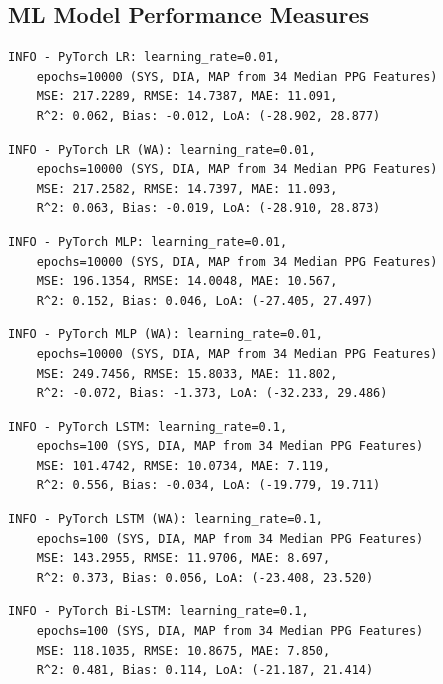 \subsection{ML Model Performance Measures}\label{subsec:misc_measures}

\onehalfspacing

\begin{verbatim}
INFO - PyTorch LR: learning_rate=0.01,
    epochs=10000 (SYS, DIA, MAP from 34 Median PPG Features)
    MSE: 217.2289, RMSE: 14.7387, MAE: 11.091,
    R^2: 0.062, Bias: -0.012, LoA: (-28.902, 28.877)
\end{verbatim}

\begin{verbatim}
INFO - PyTorch LR (WA): learning_rate=0.01,
    epochs=10000 (SYS, DIA, MAP from 34 Median PPG Features)
    MSE: 217.2582, RMSE: 14.7397, MAE: 11.093,
    R^2: 0.063, Bias: -0.019, LoA: (-28.910, 28.873)
\end{verbatim}

\begin{verbatim}
INFO - PyTorch MLP: learning_rate=0.01,
    epochs=10000 (SYS, DIA, MAP from 34 Median PPG Features)
    MSE: 196.1354, RMSE: 14.0048, MAE: 10.567,
    R^2: 0.152, Bias: 0.046, LoA: (-27.405, 27.497)
\end{verbatim}

\begin{verbatim}
INFO - PyTorch MLP (WA): learning_rate=0.01,
    epochs=10000 (SYS, DIA, MAP from 34 Median PPG Features)
    MSE: 249.7456, RMSE: 15.8033, MAE: 11.802,
    R^2: -0.072, Bias: -1.373, LoA: (-32.233, 29.486)
\end{verbatim}

\begin{verbatim}
INFO - PyTorch LSTM: learning_rate=0.1,
    epochs=100 (SYS, DIA, MAP from 34 Median PPG Features)
    MSE: 101.4742, RMSE: 10.0734, MAE: 7.119,
    R^2: 0.556, Bias: -0.034, LoA: (-19.779, 19.711)
\end{verbatim}

\begin{verbatim}
INFO - PyTorch LSTM (WA): learning_rate=0.1,
    epochs=100 (SYS, DIA, MAP from 34 Median PPG Features)
    MSE: 143.2955, RMSE: 11.9706, MAE: 8.697,
    R^2: 0.373, Bias: 0.056, LoA: (-23.408, 23.520)
\end{verbatim}

\begin{verbatim}
INFO - PyTorch Bi-LSTM: learning_rate=0.1,
    epochs=100 (SYS, DIA, MAP from 34 Median PPG Features)
    MSE: 118.1035, RMSE: 10.8675, MAE: 7.850,
    R^2: 0.481, Bias: 0.114, LoA: (-21.187, 21.414)
\end{verbatim}

